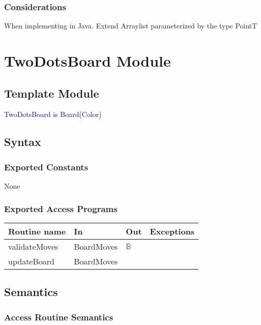 \documentclass[12pt]{article}
\begin{document}
\subsubsection* {Considerations}
When implementing in Java. Extend Arraylist parameterized by the type PointT


\newpage

\section* {TwoDotsBoard Module}

\subsection* {Template Module}

\noindent \textcolor{blue}{TwoDotsBoard is Board(Color)}

\subsection* {Syntax}

\subsubsection* {Exported Constants}

None

\subsubsection* {Exported Access Programs}

\begin{tabular}{| l | l | l | p{6cm} |}
\hline
\textbf{Routine name} & \textbf{In} & \textbf{Out} & \textbf{Exceptions}\\
\hline
validateMoves & BoardMoves & $\mathbb{B}$& \\
\hline
updateBoard & BoardMoves &  & \\
\hline
\end{tabular}

\subsection* {Semantics}

\subsubsection* {Access Routine Semantics}
\end{document}
